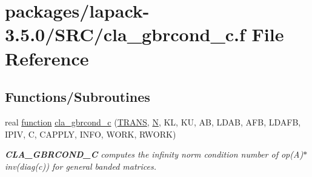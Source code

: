 \hypertarget{cla__gbrcond__c_8f}{}\section{packages/lapack-\/3.5.0/\+S\+R\+C/cla\+\_\+gbrcond\+\_\+c.f File Reference}
\label{cla__gbrcond__c_8f}
\subsection*{Functions/\+Subroutines}
\begin{DoxyCompactItemize}
\item 
real \hyperlink{afunc_8m_a7b5e596df91eadea6c537c0825e894a7}{function} \hyperlink{group__complexGBcomputational_gae7901c9eb2d9cac0f012a12a20d56956}{cla\+\_\+gbrcond\+\_\+c} (\hyperlink{superlu__enum__consts_8h_a0c4e17b2d5cea33f9991ccc6a6678d62a1f61e3015bfe0f0c2c3fda4c5a0cdf58}{T\+R\+A\+N\+S}, \hyperlink{polmisc_8c_a0240ac851181b84ac374872dc5434ee4}{N}, K\+L, K\+U, A\+B, L\+D\+A\+B, A\+F\+B, L\+D\+A\+F\+B, I\+P\+I\+V, C, C\+A\+P\+P\+L\+Y, I\+N\+F\+O, W\+O\+R\+K, R\+W\+O\+R\+K)
\begin{DoxyCompactList}\small\item\em {\bfseries C\+L\+A\+\_\+\+G\+B\+R\+C\+O\+N\+D\+\_\+\+C} computes the infinity norm condition number of op(\+A)$\ast$inv(diag(c)) for general banded matrices. \end{DoxyCompactList}\end{DoxyCompactItemize}

